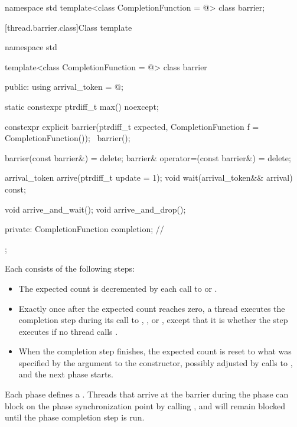 %
\begin{codeblock}
namespace std {
  template<class CompletionFunction = @\seebelow@>
    class barrier;
}
\end{codeblock}

[thread.barrier.class]{Class template }

\begin{codeblock}
namespace std {
  template<class CompletionFunction = @\seebelow@>
  class barrier {
  public:
    using arrival_token = @\seebelow@;

    static constexpr ptrdiff_t max() noexcept;

    constexpr explicit barrier(ptrdiff_t expected,
                               CompletionFunction f = CompletionFunction());
    ~barrier();

    barrier(const barrier&) = delete;
    barrier& operator=(const barrier&) = delete;

    arrival_token arrive(ptrdiff_t update = 1);
    void wait(arrival_token&& arrival) const;

    void arrive_and_wait();
    void arrive_and_drop();

  private:
    CompletionFunction completion;      // \expos
  };
}
\end{codeblock}

\pnum
Each  consists of the following steps:
\begin{itemize}
\item
  The expected count is decremented
  by each call to  or .
\item
  Exactly once after the expected count reaches zero, a thread
  executes the completion step during its call
  to , , or ,
  except that it is 
  whether the step executes if no thread calls .
\item
  When the completion step finishes,
  the expected count is reset
  to what was specified by the  argument to the constructor,
  possibly adjusted by calls to , and
  the next phase starts.
\end{itemize}

%
\pnum
{}%
Each phase defines a .
Threads that arrive at the barrier during the phase
can block on the phase synchronization point by calling , and
will remain blocked until the phase completion step is run.

